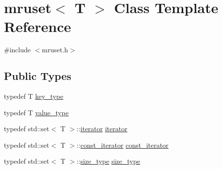 \hypertarget{classmruset}{}\section{mruset$<$ T $>$ Class Template Reference}
\label{classmruset}


{\ttfamily \#include $<$mruset.\+h$>$}

\subsection*{Public Types}
\begin{DoxyCompactItemize}
\item 
typedef T \mbox{\hyperlink{classmruset_a282941ee7f0438b0c09274b10c78cda0}{key\+\_\+type}}
\item 
typedef T \mbox{\hyperlink{classmruset_a834c3e7f8e9cf615ebe27752443f9a3a}{value\+\_\+type}}
\item 
typedef std\+::set$<$ T $>$\+::\mbox{\hyperlink{classmruset_a246172eda1afff45be47a013c14b1ad6}{iterator}} \mbox{\hyperlink{classmruset_a246172eda1afff45be47a013c14b1ad6}{iterator}}
\item 
typedef std\+::set$<$ T $>$\+::\mbox{\hyperlink{classmruset_a74c77f7642e8e4db7cc79991c4345692}{const\+\_\+iterator}} \mbox{\hyperlink{classmruset_a74c77f7642e8e4db7cc79991c4345692}{const\+\_\+iterator}}
\item 
typedef std\+::set$<$ T $>$\+::\mbox{\hyperlink{classmruset_aaee46af18d8a5bdc503e9570e499a335}{size\+\_\+type}} \mbox{\hyperlink{classmruset_aaee46af18d8a5bdc503e9570e499a335}{size\+\_\+type}}
\end{DoxyCompactItemize}
